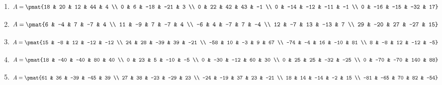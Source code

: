\begin{enumerate}
\item

\begin{align*}
A = \pmat{18 & 20 & 12 & 44 & 4 \\ 0 & 6 & -18 & -21 & 3 \\ 0 & 22 & 42 & 43 & -1 \\ 0 & -14 & -12 & -11 & -1 \\ 0 & -16 & -15 & -32 & 17}
\end{align*}

\item

\begin{align*}
A = \pmat{6 & -4 & 7 & -7 & 4 \\ 11 & -9 & 7 & -7 & 4 \\ -6 & 4 & -7 & 7 & -4 \\ 12 & -7 & 13 & -13 & 7 \\ 29 & -20 & 27 & -27 & 15}
\end{align*}

\item

\begin{align*}
A = \pmat{15 & -8 & 12 & -12 & -12 \\ 24 & 28 & -39 & 39 & -21 \\ -58 & 10 & -3 & 9 & 67 \\ -74 & -4 & 16 & -10 & 81 \\ 8 & -8 & 12 & -12 & -5}
\end{align*}

\item

\begin{align*}
A = \pmat{18 & -40 & -40 & 80 & 40 \\ 0 & 23 & 5 & -10 & -5 \\ 0 & -30 & -12 & 60 & 30 \\ 0 & 25 & 25 & -32 & -25 \\ 0 & -70 & -70 & 140 & 88}
\end{align*}

\item

\begin{align*}
A = \pmat{61 & 36 & -39 & -45 & 39 \\ 27 & 38 & -23 & -29 & 23 \\ -24 & -19 & 37 & 23 & -21 \\ 18 & 14 & -14 & -2 & 15 \\ -81 & -65 & 70 & 82 & -54}
\end{align*}


\end{enumerate}
